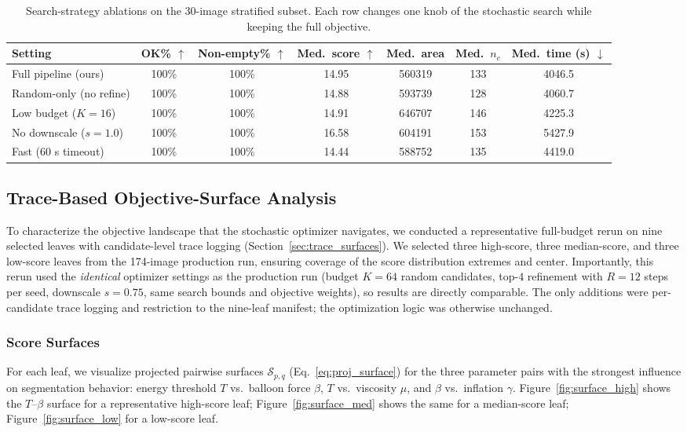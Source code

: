 \documentclass[11pt,a4paper]{article}
\begin{document}
\begin{table}[t]
\centering
\caption{Search-strategy ablations on the 30-image stratified subset. Each row changes one knob of the stochastic search while keeping the full objective.}
\label{tab:abl_search}
\begin{tabular}{lcccccc}
\toprule
Setting & OK\% $\uparrow$ & Non-empty\% $\uparrow$ & Med.\ score $\uparrow$ & Med.\ area & Med.\ $n_c$ & Med.\ time (s) $\downarrow$ \\
\midrule
Full pipeline (ours) & 100\% & 100\% & 14.95 & 560319 & 133 & 4046.5 \\
Random-only (no refine) & 100\% & 100\% & 14.88 & 593739 & 128 & 4060.7 \\
Low budget ($K{=}16$) & 100\% & 100\% & 14.91 & 646707 & 146 & 4225.3 \\
No downscale ($s{=}1.0$) & 100\% & 100\% & 16.58 & 604191 & 153 & 5427.9 \\
Fast (60 s timeout) & 100\% & 100\% & 14.44 & 588752 & 135 & 4419.0 \\
\bottomrule
\end{tabular}
\end{table}

\subsection{Trace-Based Objective-Surface Analysis}
\label{sec:trace_analysis}
To characterize the objective landscape that the stochastic optimizer navigates, we conducted a representative full-budget rerun on nine selected leaves with candidate-level trace logging (Section~\ref{sec:trace_surfaces}). We selected three high-score, three median-score, and three low-score leaves from the 174-image production run, ensuring coverage of the score distribution extremes and center. Importantly, this rerun used the \emph{identical} optimizer settings as the production run (budget $K{=}64$ random candidates, top-$4$ refinement with $R{=}12$ steps per seed, downscale $s{=}0.75$, same search bounds and objective weights), so results are directly comparable. The only additions were per-candidate trace logging and restriction to the nine-leaf manifest; the optimization logic was otherwise unchanged.

\subsubsection{Score Surfaces}
For each leaf, we visualize projected pairwise surfaces $\mathcal{S}_{p,q}$ (Eq.~\ref{eq:proj_surface}) for the three parameter pairs with the strongest influence on segmentation behavior: energy threshold $T$ vs.\ balloon force $\beta$, $T$ vs.\ viscosity $\mu$, and $\beta$ vs.\ inflation $\gamma$. Figure~\ref{fig:surface_high} shows the $T$--$\beta$ surface for a representative high-score leaf; Figure~\ref{fig:surface_med} shows the same for a median-score leaf; Figure~\ref{fig:surface_low} for a low-score leaf.
\end{document}
